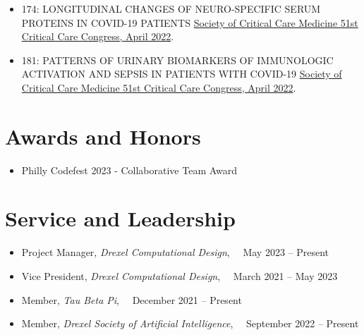 \documentclass[letterpaper,11pt]{article}
\newcommand{\reusmeSubHeadingListSmallStart}{\begin{itemize}[itemsep=-4pt, parsep=4pt]}
\newcommand{\resumeSubHeadingListSmallEnd}{\end{itemize}}
\begin{document}
\reusmeSubHeadingListSmallStart
\item\small {
    174: LONGITUDINAL CHANGES OF NEURO-SPECIFIC SERUM PROTEINS IN COVID-19 PATIENTS
    \href{https://doi.org/10.1097/01.ccm.0000807020.73561.ed}
    {Society of Critical Care Medicine 51st Critical Care Congress, April 2022}.
}

\item\small {
    181: PATTERNS OF URINARY BIOMARKERS OF IMMUNOLOGIC ACTIVATION AND SEPSIS IN PATIENTS WITH COVID-19
    \href{https://doi.org/10.1097/01.ccm.0000807048.74105.59}
    {Society of Critical Care Medicine 51st Critical Care Congress, April 2022}.
}

\resumeSubHeadingListSmallEnd

\vspace{-20pt}


\section{Awards and Honors}
\begin{itemize}[leftmargin=0.25in, label={}]
    \item{
                Philly Codefest 2023 - Collaborative Team Award
          }
\end{itemize}
\vspace{-15pt}



\section{Service and Leadership}

\reusmeSubHeadingListSmallStart
\item\small {
    Project Manager, \emph{Drexel Computational Design}, ~~May 2023 -- Present
}
\item\small {
    Vice President, \emph{Drexel Computational Design}, ~~March 2021 -- May 2023 \\
}
\item\small {
    Member, \emph{Tau Beta Pi}, ~~December 2021 -- Present
}
\item\small {
    Member, \emph{Drexel Society of Artificial Intelligence}, ~~September 2022 -- Present
}
\resumeSubHeadingListSmallEnd
\end{document}

